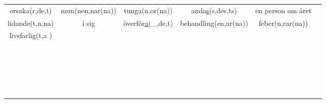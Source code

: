 \begin{center}
\begin{adjustwidth}{-2.5cm}{}
\begin{tabular}{|c c c c c c|}
            orsaka(r,de,t) & mun(nen,nar(na)) & tunga(n,or(na)) & anda\underline{s}(s,des,ts) & en person om året &  \\
            lidande(t,n,na) & i sig & överför\underline{a}(\_,de,t) & behandling(en,ar(na)) & feber(n,rar(na)) &  \\
            livsfarlig(t,a ) &  &  &  &  &  \\
             &  &  &  &  &  \\
             &  &  &  &  &  \\
             &  &  &  &  &  \\
             &  &  &  &  &  \\
             &  &  &  &  &  \\
             &  &  &  &  &  \\
             &  &  &  &  &  \\
             &  &  &  &  &  \\
             &  &  &  &  &  \\
             &  &  &  &  &  \\
             &  &  &  &  &  \\
             &  &  &  &  &  \\
             &  &  &  &  &  \\
             &  &  &  &  &  \\
             &  &  &  &  &  \\
             &  &  &  &  &  \\
             &  &  &  &  &  \\
             &  &  &  &  &  \\
             &  &  &  &  &  \\
             &  &  &  &  &  \\
             &  &  &  &  &  \\
            \hline
        \end{tabular}
    \end{adjustwidth}
\end{center}

